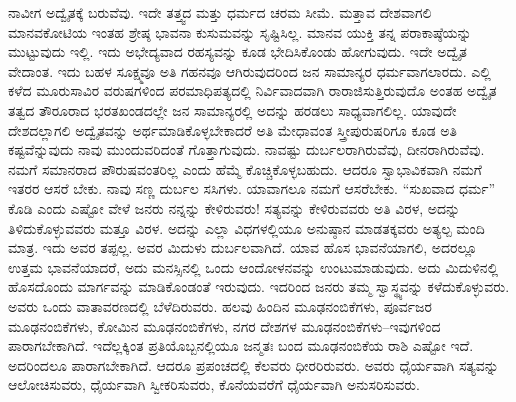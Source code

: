 ನಾವೀಗ ಅದ್ವೈತಕ್ಕೆ ಬರುವೆವು. ಇದೇ ತತ್ತ್ವದ ಮತ್ತು ಧರ್ಮದ ಚರಮ ಸೀಮೆ. ಮತ್ತಾವ ದೇಶವಾಗಲಿ ಮಾನವಕೋಟಿಯ ಇಂತಹ ಶ್ರೇಷ್ಠ ಭಾವನಾ ಕುಸುಮವನ್ನು ಸೃಷ್ಟಿಸಿಲ್ಲ. ಮಾನವ ಯುಕ್ತಿ ತನ್ನ ಪರಾಕಾಷ್ಠೆಯನ್ನು ಮುಟ್ಟುವುದು ಇಲ್ಲಿ. ಇದು ಅಭೇದ್ಯವಾದ ರಹಸ್ಯವನ್ನು ಕೂಡ ಭೇದಿಸಿಕೊಂಡು ಹೋಗುವುದು. ಇದೇ ಅದ್ವೈತ ವೇದಾಂತ. ಇದು ಬಹಳ ಸೂಕ್ಷ್ಮವೂ ಅತಿ ಗಹನವೂ ಆಗಿರುವುದರಿಂದ ಜನ ಸಾಮಾನ್ಯರ ಧರ್ಮವಾಗಲಾರದು. ಎಲ್ಲಿ ಕಳೆದ ಮೂರುಸಾವಿರ ವರುಷಗಳಿಂದ ಪರಮಾಧಿಪತ್ಯದಲ್ಲಿ ನಿರ್ವಿವಾದವಾಗಿ ರಾರಾಜಿಸುತ್ತಿರುವುದೊ ಅಂತಹ ಅದ್ವೈತ ತತ್ವದ ತೌರೂರಾದ ಭರತಖಂಡದಲ್ಲೇ ಜನ ಸಾಮಾನ್ಯರಲ್ಲಿ ಅದನ್ನು ಹರಡಲು ಸಾಧ್ಯವಾಗಲಿಲ್ಲ. ಯಾವುದೇ ದೇಶದಲ್ಲಾಗಲಿ ಅದ್ವೈತವನ್ನು ಅರ್ಥಮಾಡಿಕೊಳ್ಳಬೇಕಾದರೆ ಅತಿ ಮೇಧಾವಂತ ಸ್ತ್ರೀಪುರುಷರಿಗೂ ಕೂಡ ಅತಿ ಕಷ್ಟವೆನ್ನುವುದು ನಾವು ಮುಂದುವರಿದಂತೆ ಗೊತ್ತಾಗುವುದು. ನಾವಷ್ಟು ದುರ್ಬಲರಾಗಿರುವೆವು, ದೀನರಾಗಿರುವೆವು. ನಮಗೆ ಸಮಾನರಾದ ಪೌರುಷವಂತರಿಲ್ಲ ಎಂದು ಹೆಮ್ಮೆ ಕೊಚ್ಚಿಕೊಳ್ಳಬಹುದು. ಆದರೂ ಸ್ವಾಭಾವಿಕವಾಗಿ ನಮಗೆ ಇತರರ ಆಸರೆ ಬೇಕು. ನಾವು ಸಣ್ಣ ದುರ್ಬಲ ಸಸಿಗಳು. ಯಾವಾಗಲೂ ನಮಗೆ ಆಸರೆಬೇಕು. “ಸುಖವಾದ ಧರ್ಮ” ಕೊಡಿ ಎಂದು ಎಷ್ಟೋ ವೇಳೆ ಜನರು ನನ್ನನ್ನು ಕೇಳಿರುವರು! ಸತ್ಯವನ್ನು ಕೇಳಿರುವವರು ಅತಿ ವಿರಳ, ಅದನ್ನು ತಿಳಿದುಕೊಳ್ಳುವವರು ಮತ್ತೂ ವಿರಳ. ಅದನ್ನು ಎಲ್ಲಾ ವಿಧಗಳಲ್ಲಿಯೂ ಅನುಷ್ಠಾನ ಮಾಡತಕ್ಕವರು ಅತ್ಯಲ್ಪ ಮಂದಿ ಮಾತ್ರ. ಇದು ಅವರ ತಪ್ಪಲ್ಲ. ಅವರ ಮಿದುಳು ದುರ್ಬಲವಾಗಿದೆ. ಯಾವ ಹೊಸ ಭಾವನೆಯಾಗಲಿ, ಅದರಲ್ಲೂ ಉತ್ತಮ ಭಾವನೆಯಾದರೆ, ಅದು ಮನಸ್ಸಿನಲ್ಲಿ ಒಂದು ಆಂದೋಳನವನ್ನು ಉಂಟುಮಾಡುವುದು. ಅದು ಮಿದುಳಿನಲ್ಲಿ ಹೊಸದೊಂದು ಮಾರ್ಗವನ್ನು ಮಾಡಿಕೊಂಡಂತೆ ಇರುವುದು. ಇದರಿಂದ ಜನರು ತಮ್ಮ ಸ್ವಾಸ್ಥ್ಯವನ್ನು ಕಳೆದುಕೊಳ್ಳುವರು. ಅವರು ಒಂದು ವಾತಾವರಣದಲ್ಲಿ ಬೆಳೆದಿರುವರು. ಹಲವು ಹಿಂದಿನ ಮೂಢನಂಬಿಕೆಗಳು, ಪೂರ್ವಜರ ಮೂಢನಂಬಿಕೆಗಳು, ಕೋಮಿನ ಮೂಢನಂಬಿಕೆಗಳು, ನಗರ ದೇಶಗಳ ಮೂಢನಂಬಿಕೆಗಳು–ಇವುಗಳಿಂದ ಪಾರಾಗಬೇಕಾಗಿದೆ. ಇದೆಲ್ಲಕ್ಕಿಂತ ಪ್ರತಿಯೊಬ್ಬನಲ್ಲಿಯೂ ಜನ್ಮತಃ ಬಂದ ಮೂಢನಂಬಿಕೆಯ ರಾಶಿ ಎಷ್ಟೋ ಇದೆ. ಅದರಿಂದಲೂ ಪಾರಾಗಬೇಕಾಗಿದೆ. ಆದರೂ ಪ್ರಪಂಚದಲ್ಲಿ ಕೆಲವರು ಧೀರರಿರುವರು. ಅವರು ಧೈರ್ಯವಾಗಿ ಸತ್ಯವನ್ನು ಆಲೋಚಿಸುವರು, ಧೈರ್ಯವಾಗಿ ಸ್ವೀಕರಿಸುವರು, ಕೊನೆಯವರೆಗೆ ಧೈರ್ಯವಾಗಿ ಅನುಸರಿಸುವರು.

